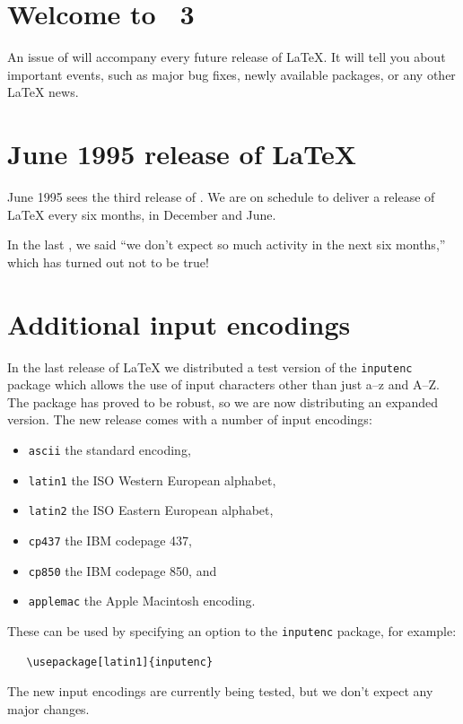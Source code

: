 \documentclass{ltnews}
\providecommand\pkg[1]{\texttt{#1}}
\providecommand\option[1]{\texttt{#1}}
\begin{document}
\maketitle

\section{Welcome to \LaTeXNews~3}

An issue of \emph{\LaTeXNews} will accompany every future release of
\LaTeX.  It will tell you about important events, such as major bug
fixes, newly available packages, or any other \LaTeX{} news.

\section{June 1995 release of \LaTeX}

June 1995 sees the third release of \LaTeXe.  We are on schedule
to deliver a release of \LaTeX{} every six months, in December and
June.

In the last \emph{\LaTeXNews}, we said ``we don't expect so much
activity in the next six months,'' which has turned out not to be
true!

\section{Additional input encodings}

In the last release of \LaTeX{} we distributed a test version of the
\pkg{inputenc} package which allows the use of input characters
other than just a--z and A--Z.  The package has proved to be robust,
so we are now distributing an expanded version.
The new release comes with a number of input encodings:

\begin{itemize}
\item \option{ascii} the standard encoding,
\item \option{latin1} the ISO Western European alphabet,
\item \option{latin2} the ISO Eastern European alphabet,
\item \option{cp437} the IBM codepage 437,
\item \option{cp850} the IBM codepage 850, and
\item \option{applemac} the Apple Macintosh encoding.
\end{itemize}
These can be used by specifying an option to the \pkg{inputenc}
package, for example:
\begin{verbatim}
   \usepackage[latin1]{inputenc}
\end{verbatim}
The new input encodings are currently being tested, but we don't
expect any major changes.
\end{document}

